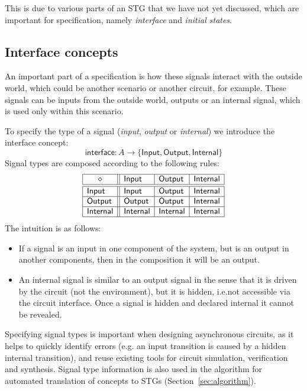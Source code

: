 \documentclass[british, journal]{IEEEtran}
\begin{document}
This is due to various parts of an STG that we have not yet discussed, which are important
for specification, namely \emph{interface} and \emph{initial states}.

\subsection{Interface concepts \label{sub:interface}} 

An important part of a specification is how these signals interact with the outside world, which could
be another scenario or another circuit, for example. These signals can be inputs from the outside world,
outputs or an internal signal, which is used only within this scenario. 

To specify the type of a signal (\emph{input},
\emph{output} or \emph{internal}) we introduce the \textsf{interface} concept:
\[
\mathsf{interface} : A \rightarrow \{\mathsf{Input}, \mathsf{Output},
\mathsf{Internal}\}
\]
Signal types are composed according to the following rules:
\[
\begin{array}{|l||l|l|l|}
\hline
\multicolumn{1}{|c||}{\diamond} & \mathsf{Input} & \mathsf{Output} &
\mathsf{Internal} \\ \hline \hline
\mathsf{Input} & \mathsf{Input} & \mathsf{Output} & \mathsf{Internal} \\ \hline
\mathsf{Output} & \mathsf{Output} & \mathsf{Output} & \mathsf{Internal} \\
\hline
\mathsf{Internal}& \mathsf{Internal} & \mathsf{Internal} & \mathsf{Internal} \\
\hline
\end{array}
\]
The intuition is as follows:
\begin{itemize}
    \item If a signal is an input in one component of the system, but is an
    output in another components, then in the composition it will be an output.
    \item An internal signal is similar to an output signal in the sense
that it is driven by the circuit (not the environment), but it is hidden, i.e.not accessible via the circuit interface. Once a signal is hidden and declared    internal it cannot be revealed.
\end{itemize}

\noindent Specifying signal types is important when designing asynchronous
circuits, as it helps to quickly identify errors (e.g. an input transition is
caused by a hidden internal transition), and reuse existing tools for circuit
simulation, verification and synthesis. Signal type information is also used
in the algorithm for automated translation of concepts to
STGs (Section~\ref{sec:algorithm}).
\end{document}
